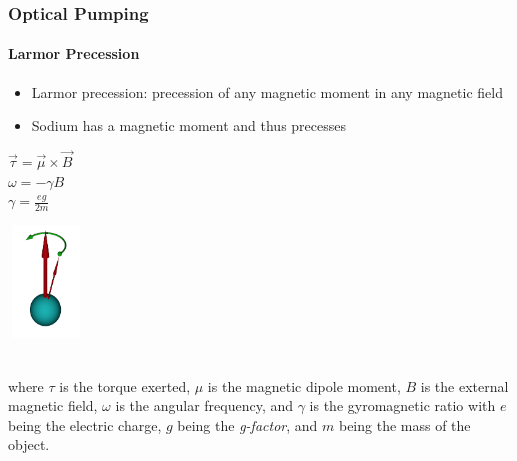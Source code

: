 \documentclass{beamer}
\begin{document}
\begin{frame}
  \frametitle{Optical Pumping}
  \framesubtitle{Larmor Precession}
  \begin{itemize}
	\item Larmor precession: precession of any magnetic moment in any magnetic field\\
	\item Sodium has a magnetic moment and thus precesses\\
  \end{itemize}
	  \begin{minipage}{0.4\textwidth}
		\vspace{-3cm}
	  \begin{center}
		 $\vec \tau = \vec \mu \times \vec B $\\
	   $\omega = -\gamma B$\\
	   $ \gamma = \frac{eg}{2m}$
	\end{center}
  \end{minipage}
  \hfill
  \begin{minipage}[b]{0.4\textwidth}
  \includegraphics[width = 2cm, height = 3cm]{Images/larmorprecession.png}
  \end{minipage}
	\\\scriptsize{where $\tau$ is the torque exerted, $\mu$ is the magnetic dipole moment, $B$ is the external magnetic field, $\omega$ is the angular frequency, and $\gamma$ is the gyromagnetic ratio with $e$ being the electric charge, $g$ being the \textit{g-factor}, and $m$ being the mass of the object.}
\end{frame}
\end{document}

